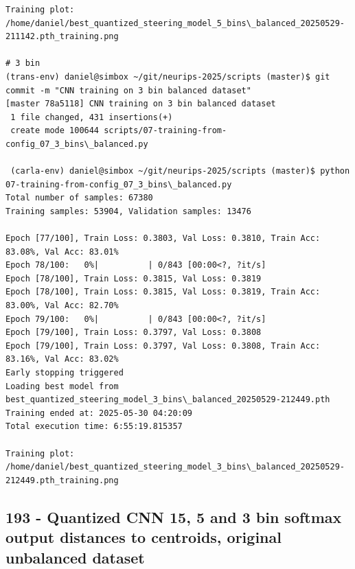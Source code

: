\begin{verbatim}
Training plot:
/home/daniel/best_quantized_steering_model_5_bins\_balanced_20250529-211142.pth_training.png

# 3 bin
(trans-env) daniel@simbox ~/git/neurips-2025/scripts (master)$ git commit -m "CNN training on 3 bin balanced dataset"
[master 78a5118] CNN training on 3 bin balanced dataset
 1 file changed, 431 insertions(+)
 create mode 100644 scripts/07-training-from-config_07_3_bins\_balanced.py

 (carla-env) daniel@simbox ~/git/neurips-2025/scripts (master)$ python 07-training-from-config_07_3_bins\_balanced.py
Total number of samples: 67380
Training samples: 53904, Validation samples: 13476

Epoch [77/100], Train Loss: 0.3803, Val Loss: 0.3810, Train Acc: 83.08%, Val Acc: 83.01%
Epoch 78/100:   0%|          | 0/843 [00:00<?, ?it/s]
Epoch [78/100], Train Loss: 0.3815, Val Loss: 0.3819
Epoch [78/100], Train Loss: 0.3815, Val Loss: 0.3819, Train Acc: 83.00%, Val Acc: 82.70%
Epoch 79/100:   0%|          | 0/843 [00:00<?, ?it/s]
Epoch [79/100], Train Loss: 0.3797, Val Loss: 0.3808
Epoch [79/100], Train Loss: 0.3797, Val Loss: 0.3808, Train Acc: 83.16%, Val Acc: 83.02%
Early stopping triggered
Loading best model from best_quantized_steering_model_3_bins\_balanced_20250529-212449.pth
Training ended at: 2025-05-30 04:20:09
Total execution time: 6:55:19.815357

Training plot:
/home/daniel/best_quantized_steering_model_3_bins\_balanced_20250529-212449.pth_training.png

\end{verbatim}

\subsection{193 - Quantized CNN 15, 5 and 3 bin softmax output distances to centroids, original unbalanced dataset}
\label{app_res:193}

